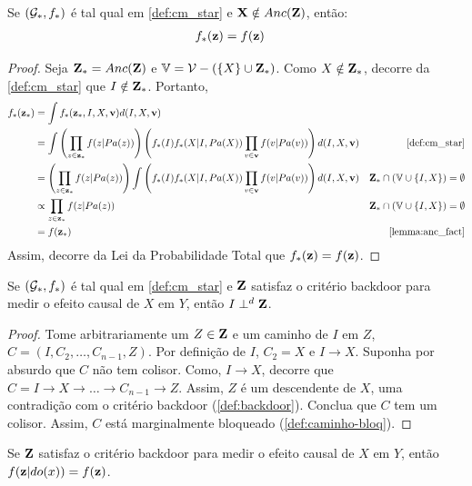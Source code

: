 \begin{lemma}
 \label{lemma:backdoor_4}
 Se $({\mathcal G}_*, f_*)$ é tal qual em \cref{def:cm_star} e
 ${\mathbf{X}} \notin Anc({\mathbf{Z}})$, então:
 \begin{align*}
  f_*({\mathbf{z}}) &= f({\mathbf{z}})
 \end{align*}
\end{lemma}

\begin{proof}
 Seja ${\mathbf{Z}}_* = Anc({\mathbf{Z}})$ e
 ${\mathbb V} = {\mathcal V} - (\{X\} \cup {\mathbf{Z}}_*)$.
 Como $X \notin {\mathbf{Z}}_*$, decorre 
 da \cref{def:cm_star} que $I \notin {\mathbf{Z}}_*$.
 Portanto,
 \begin{align*}
  f_*(\z_*) 
  &= \int f_*(\z_*, I,X,\bv) d(I,X,\bv) \\
  &= \int \left(\prod_{z \in \z_*} f(z|Pa(z))\right)
  \left(f_*(I)f_*(X|I,Pa(X))
  \prod_{v \in \bv} f(v|Pa(v))\right)d(I,X,\bv)
  & \text{\cref{def:cm_star}} \\
  &= \left(\prod_{z \in \z_*} f(z|Pa(z))\right) 
  \int \left(f_*(I)f_*(X|I,Pa(X)) 
  \prod_{v \in \bv} f(v|Pa(v))\right)d(I,X,\bv) 
  & \Z_* \cap (\V \cup \{I,X\}) = \emptyset \\
  &\propto \prod_{z \in \z_*} f(z|Pa(z)) 
  & \Z_* \cap (\V \cup \{I,X\}) = \emptyset \\
  &= f(\z_*) 
  & \text{\cref{lemma:anc_fact}}
 \end{align*}
 Assim, decorre da Lei da Probabilidade Total que
 $f_*({\mathbf{z}}) = f({\mathbf{z}})$.
\end{proof}

\begin{lemma}
 \label{lemma:backdoor_5}
 Se $({\mathcal G}_*, f_*)$ é tal qual em \cref{def:cm_star} e
 ${\mathbf{Z}}$ satisfaz o critério backdoor para
 medir o efeito causal de $X$ em $Y$, então $I \perp^d {\mathbf{Z}}$.
\end{lemma}

\begin{proof}
 Tome arbitrariamente um $Z \in {\mathbf{Z}}$ e
 um caminho de $I$ em $Z$, 
 $C = (I, C_2, \ldots, C_{n-1}, Z)$.
 Por definição de $I$, $C_2 = X$ e
 $I \rightarrow X$. 
 Suponha por absurdo que $C$ não tem colisor.
 Como, $I \rightarrow X$, decorre que
 $C = I \rightarrow X \rightarrow \ldots 
 \rightarrow C_{n-1} \rightarrow Z$.
 Assim, $Z$ é um descendente de $X$,
 uma contradição com 
 o critério backdoor (\cref{def:backdoor}).
 Conclua que $C$ tem um colisor.
 Assim, $C$ está marginalmente bloqueado
 (\cref{def:caminho-bloq}).
\end{proof}

\begin{lemma}
 \label{thm:backdoor_pt_2}
 Se ${\mathbf{Z}}$ satisfaz o critério backdoor para
 medir o efeito causal de $X$ em $Y$, então
 $f({\mathbf{z}}|do(x)) = f({\mathbf{z}})$.
\end{lemma}

